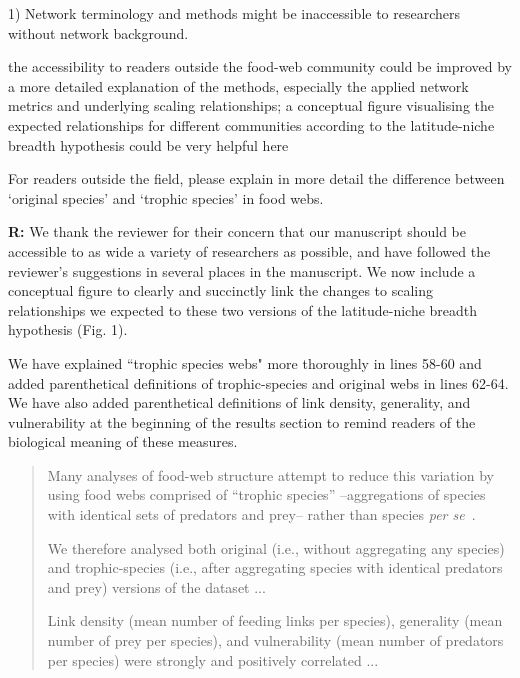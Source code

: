 \documentclass[12pt]{letter}
\newenvironment{refquote}{\bigskip \begin{it}}{\end{it}\smallskip}
\begin{document}
  1) Network terminology and methods might be inaccessible to researchers
  without network background.

  \begin{refquote}

    the accessibility to readers outside the food-web community could be
    improved by a more detailed explanation of the methods, especially the
    applied network metrics and underlying scaling relationships; a conceptual
    figure visualising the expected relationships for different communities
    according to the latitude-niche breadth hypothesis could be very helpful
    here

    \smallskip

     For readers outside the field, please explain in more detail the
     difference between `original species' and `trophic species' in food webs.

  \end{refquote}


  \textbf{R:} We thank the reviewer for their concern that our manuscript
  should be accessible to as wide a variety of researchers as possible, and
  have followed the reviewer's suggestions in several places in the manuscript.
  We now include a conceptual figure to clearly and succinctly link the changes
  to scaling relationships we expected to these two versions of the latitude-niche
  breadth hypothesis (Fig. 1).


  We have explained ``trophic species webs" more thoroughly
  in lines 58-60 and added parenthetical definitions of
  trophic-species and original webs in lines 62-64. We have also added parenthetical definitions
  of link density, generality, and vulnerability at the beginning of the results section
  to remind readers of the biological meaning of these measures.

  \begin{quotation}

    Many analyses of food-web structure attempt to reduce 
    this variation by using food webs comprised of ``trophic
    species'' --aggregations of species with identical sets 
    of predators and prey-- rather than species 
    \emph{per se}~\cite{Martinez1991,Dunne2004,Vermaat2009,Dunne2013}.

    \smallskip

    We therefore analysed both original (i.e., without 
    aggregating any species) and trophic-species (i.e., 
    after aggregating species with identical predators and 
    prey) versions of the dataset ...

    \smallskip

    Link density (mean number of feeding links per 
    species), generality (mean number of prey per species), 
    and vulnerability (mean number of predators per 
    species) were strongly and positively correlated ...

  \end{quotation}
\end{document}
